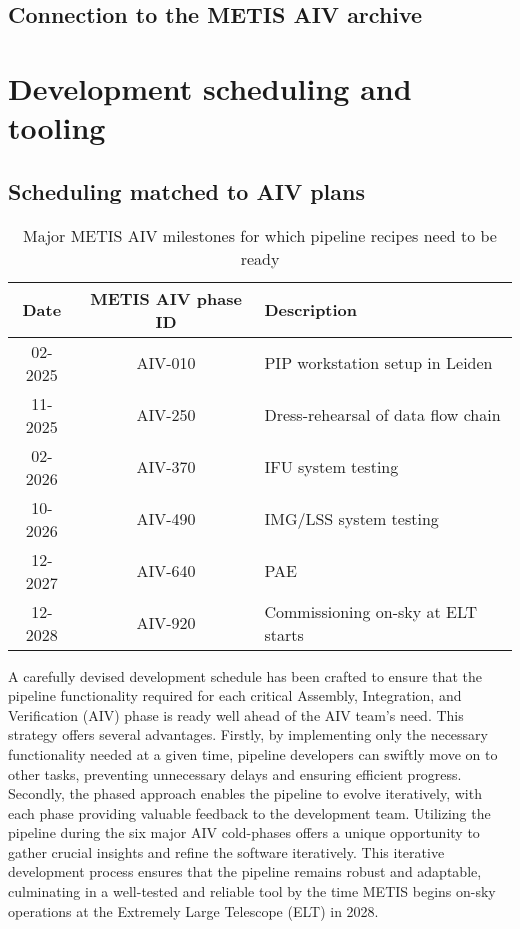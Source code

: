 \documentclass[a4paper]{spie}  %
\begin{document}
\subsection{Connection to the METIS AIV archive}
\label{ssec:imp_archive}



\section{Development scheduling and tooling}
\label{sec:development}

\subsection{Scheduling matched to AIV plans}
\label{ssec:dev_aiv}

\begin{table}[]
    \centering
\caption{Major METIS AIV milestones for which pipeline recipes need to be ready}
\label{tab:dev_aiv_milestones}
    \begin{tabular}{c|c|l}
    \hline
    \hline
         Date &   METIS AIV phase ID & Description\\
         \hline
         02-2025 &   AIV-010&PIP workstation setup in Leiden\\
         11-2025 &   AIV-250&Dress-rehearsal of data flow chain\\
 02-2026 & AIV-370&IFU system testing\\
 10-2026 &  AIV-490&IMG/LSS system testing\\
 12-2027 & AIV-640&PAE\\
 12-2028 & AIV-920&Commissioning on-sky at ELT starts\\
 \hline
 \end{tabular}
      
\end{table}

A carefully devised development schedule has been crafted to ensure that the pipeline functionality required for each critical Assembly, Integration, and Verification (AIV) phase is ready well ahead of the AIV team's need. This strategy offers several advantages. Firstly, by implementing only the necessary functionality needed at a given time, pipeline developers can swiftly move on to other tasks, preventing unnecessary delays and ensuring efficient progress. Secondly, the phased approach enables the pipeline to evolve iteratively, with each phase providing valuable feedback to the development team. Utilizing the pipeline during the six major AIV cold-phases offers a unique opportunity to gather crucial insights and refine the software iteratively. This iterative development process ensures that the pipeline remains robust and adaptable, culminating in a well-tested and reliable tool by the time METIS begins on-sky operations at the Extremely Large Telescope (ELT) in 2028. 
\end{document}
